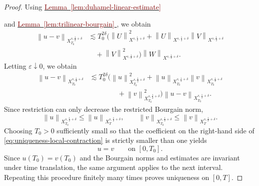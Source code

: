 \documentclass[12pt,oneside,reqno]{amsart}
\newcommand{\lemref}[1]{%
    \hyperref[#1]{%
        \textcolor{Maroon}{Lemma~\ref*{#1}}%
    }%
}
\numberwithin{equation}{section}
\theoremstyle{plain}
\newcommand{\norm}[1]{%
    \left\lVert #1\right\rVert%
}
\newcommand{\xnorm}[3]{%
    \left\lVert #1\right\rVert_{X^{{#2},{#3}}}%
}
\begin{document}
\begin{proof}
Using
\lemref{lem:duhamel-linear-estimate}
and
\lemref{lem:trilinear-bourgain},
we obtain
\begin{equation}
    \begin{aligned}
\norm{u-v}_{X_{T_0}^{s,\frac12+\delta}}
&\lesssim
T_0^{2\delta}
\Big(
    \xnorm{U}{s}{\frac12+\delta}^2
    +
    \xnorm{U}{s}{\frac12+\delta}
    \xnorm{V}{s}{\frac12+\delta}\\
    &\quad+
    \xnorm{V}{s}{\frac12+\delta}^2
\Big)
\xnorm{W}{s}{\frac12+\delta}.
\end{aligned}
\end{equation}
Letting $\varepsilon\downarrow0$, we obtain
\begin{equation}
\label{eq:uniqueness-local-contraction}
\begin{aligned}
\norm{u-v}_{X_{T_0}^{s,\frac12+\delta}}
&\lesssim
T_0^{2\delta}
\Big(
    \norm{u}_{X_{T_0}^{s,\frac12+\delta}}^2
    +
    \norm{u}_{X_{T_0}^{s,\frac12+\delta}}
    \norm{v}_{X_{T_0}^{s,\frac12+\delta}}
\\
&\qquad\qquad
    +
    \norm{v}_{X_{T_0}^{s,\frac12+\delta}}^2
\Big)
\norm{u-v}_{X_{T_0}^{s,\frac12+\delta}}.
\end{aligned}
\end{equation}
Since restriction can only decrease the restricted Bourgain norm,
\begin{equation}
    \norm{u}_{X_{T_0}^{s,\frac12+\delta}}
    \leq
    \norm{u}_{X_T^{s,\frac12+\delta}},
    \qquad
    \norm{v}_{X_{T_0}^{s,\frac12+\delta}}
    \leq
    \norm{v}_{X_T^{s,\frac12+\delta}}.
\end{equation}
Choosing $T_0>0$ sufficiently small so that the coefficient on the
right-hand side of
\eqref{eq:uniqueness-local-contraction}
is strictly smaller than one yields
\begin{equation}
    u=v
    \qquad
    \text{on }[0,T_0].
\end{equation}
Since $u(T_0)=v(T_0)$ and the Bourgain norms and estimates are invariant under
time translation, the same argument applies to the next interval. Repeating
this procedure finitely many
times proves uniqueness on $[0,T]$.


\end{proof}
\end{document}
